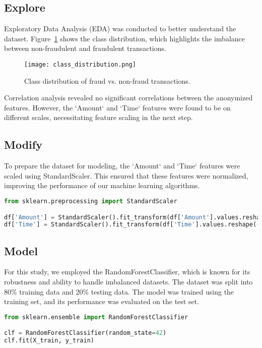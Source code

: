 \documentclass[12pt]{article}
\begin{document}
\subsection{Explore}
Exploratory Data Analysis (EDA) was conducted to better understand the dataset. Figure~\ref{fig:class_dist} shows the class distribution, which highlights the imbalance between non-fraudulent and fraudulent transactions.

\begin{figure}[H]
    \centering
    \texttt{[image: class\_distribution.png]}
    \caption{Class distribution of fraud vs. non-fraud transactions.}
    \label{fig:class_dist}
\end{figure}

Correlation analysis revealed no significant correlations between the anonymized features. However, the `Amount` and `Time` features were found to be on different scales, necessitating feature scaling in the next step.

\subsection{Modify}
To prepare the dataset for modeling, the `Amount` and `Time` features were scaled using StandardScaler. This ensured that these features were normalized, improving the performance of our machine learning algorithms.

\begin{lstlisting}[language=Python, caption=Feature Scaling in Python]
from sklearn.preprocessing import StandardScaler

df['Amount'] = StandardScaler().fit_transform(df['Amount'].values.reshape(-1, 1))
df['Time'] = StandardScaler().fit_transform(df['Time'].values.reshape(-1, 1))
\end{lstlisting}

\subsection{Model}
For this study, we employed the RandomForestClassifier, which is known for its robustness and ability to handle imbalanced datasets. The dataset was split into 80\% training data and 20\% testing data. The model was trained using the training set, and its performance was evaluated on the test set.

\begin{lstlisting}[language=Python, caption=RandomForest Model Training]
from sklearn.ensemble import RandomForestClassifier

clf = RandomForestClassifier(random_state=42)
clf.fit(X_train, y_train)
\end{lstlisting}
\end{document}
